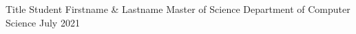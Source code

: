 \documentclass[letterpaper,12pt]{report}
\begin{document}
\thesistitle
	{Title}
	{Student Firstname \& Lastname}
	{Master of Science}
	{Department of Computer Science}
	{July 2021}

\newpage
{}




\tableofcontents
\listoffigures
{}
\listoftables
{}


\newpage
{}

%
%
%
%

{}


\end{document}
